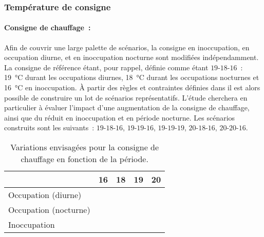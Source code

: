\subsubsection{Température de consigne} %
\label{ssub:temperature_de_consigne}
\paragraph{Consigne de chauffage~:} %
\label{par:consigne_de_chauffage}
Afin de couvrir une large palette de scénarios, la consigne en inoccupation, en occupation
diurne, et en inoccupation nocturne sont modifiées indépendamment. La consigne de
référence étant, pour rappel, définie comme étant $19$-$18$-$16$~: \SI{19}{\celsius} durant les
occupations diurnes, \SI{18}{\celsius} durant les occupations nocturnes et
\SI{16}{\celsius} en inoccupation. À partir des règles et contraintes définies dans
 il est alors possible de construire un lot de scénarios
représentatifs. L’étude cherchera en particulier à évaluer l’impact d’une augmentation de
la consigne de chauffage, ainsi que du réduit en inoccupation et en période
nocturne. Les scénarios construits sont les suivants~: $19$-$18$-$16$, $19$-$19$-$16$, $19$-$19$-$19$,
$20$-$18$-$16$, $20$-$20$-$16$.

\begin{table}
\centering
\caption{Variations envisagées pour la consigne de chauffage en fonction de la période.}
\label{tab:consigne_chauffage}
\begin{tabular}{l c c c c}
    \toprule
                           & \textbf{\num{16}}                     & \textbf{\num{18}}                     & \textbf{\num{19}}                     & \textbf{\num{20}}              \\
    \midrule
    Occupation (diurne)    &                             &                             & \cellcolor{SolarizedBrBlue} & \cellcolor{SolarizedBrBlue} \\
    Occupation (nocturne)  &                             & \cellcolor{SolarizedBrBlue} & \cellcolor{SolarizedBrBlue} & \cellcolor{SolarizedBrBlue} \\
    Inoccupation           & \cellcolor{SolarizedBrBlue} &                             & \cellcolor{SolarizedBrBlue} &                     \\
    \bottomrule
\end{tabular}
\end{table}


